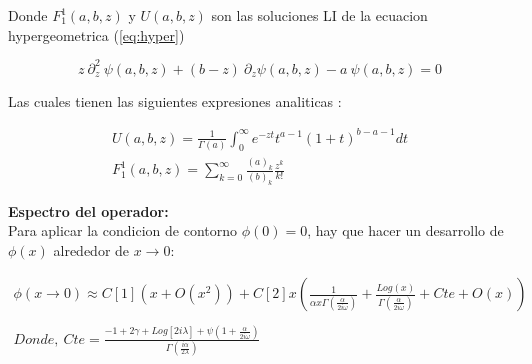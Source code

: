 Donde $F _1 ^1(a,b,z)$ y $ U(a,b,z)$ son las soluciones LI de la ecuacion hypergeometrica (\ref{eq:hyper})

\begin{equation}
    z \ \partial ^2 _z \ \psi (a,b,z) + (b-z) \
    \partial _z \psi (a,b,z)
    -a \ \psi (a,b,z) = 0
\label{eq:hyper}
\end{equation}

Las cuales tienen las siguientes expresiones analiticas  : 

\begin{equation}
\begin{array}{c}
	U(a,b,z) = \frac{1}{\Gamma (a)} 
	\int _0 ^{\infty} e ^{-zt}
	t ^{a-1}
	(1+t) ^{b-a-1}
	dt \\
	F _1 ^1 (a,b,z) = \sum _ {k=0} ^{\infty} 
	\frac{(a) _k}{(b) _k} 
	\frac{z ^k}{k!} 
\end{array}
\end{equation}






\textbf{Espectro del operador:} \\


Para aplicar la condicion de contorno $\phi (0) = 0$, hay que hacer un desarrollo de $\phi(x)$  alrededor de $x \rightarrow 0$:

\begin{equation}
\begin{array}{c}
\phi (x \rightarrow 0) \approx
C[1] ( x + O(x ^2)) + 
C[2] x 
\left( 
\frac{1}{  \alpha x  \Gamma ( \frac{ \alpha}{2 i \omega}  )   }  +
\frac{Log(x) }{\Gamma ( \frac{ \alpha}{2 i \omega} ) } + Cte + O(x)
\right)
\\ \\
Donde,  \ Cte = 
\frac{
-1 + 2 \gamma + Log[2 i \lambda] + \psi (1 + \frac{ \alpha}{2 i \omega})
}
{\Gamma (\frac{i \alpha}{2 \lambda})}
\end{array}
\label{eq.scat}
\end{equation}


